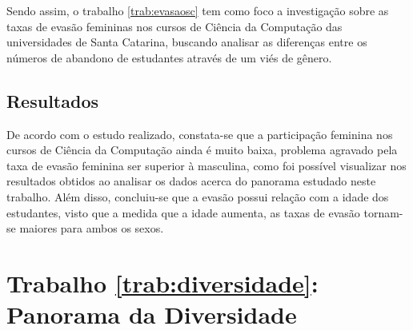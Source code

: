\documentclass[12pt]{article}
\begin{document}

 Sendo assim, o trabalho \ref{trab:evasaosc} tem como foco a investigação sobre as taxas de evasão femininas nos cursos de Ciência da Computação das universidades de Santa Catarina, buscando analisar as diferenças entre os números de abandono de estudantes através de um viés de gênero.

\subsection{Resultados}

De acordo com o estudo realizado, constata-se que a participação feminina nos cursos de Ciência da Computação ainda é muito baixa, problema agravado pela taxa de evasão feminina ser superior à masculina, como foi possível visualizar nos resultados obtidos ao analisar os dados acerca do panorama estudado neste trabalho. Além disso, concluiu-se que a evasão possui relação com a idade dos estudantes, visto que a medida que a idade aumenta, as taxas de evasão tornam-se maiores para ambos os sexos.




\section{Trabalho \ref{trab:diversidade}: Panorama da Diversidade}
\label{sec:panorama}
\end{document}
